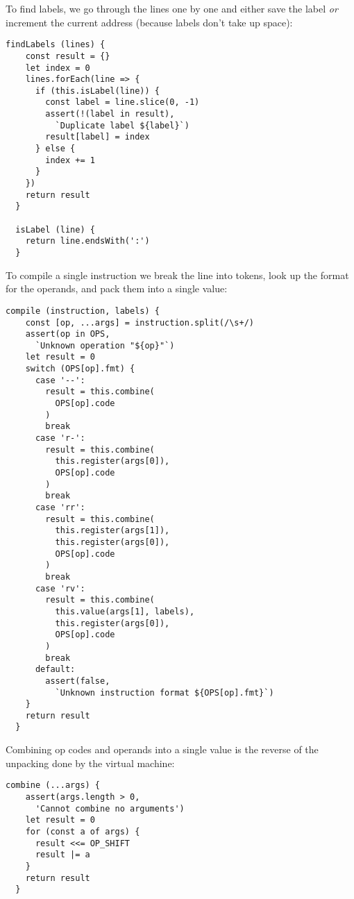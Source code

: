 \documentclass[krantzl]{krantz}
\begin{document}
To find labels,
we go through the lines one by one
and either save the label \emph{or} increment the current address
(because labels don't take up space):


\begin{lstlisting}[frame=single,frameround=tttt]
  findLabels (lines) {
    const result = {}
    let index = 0
    lines.forEach(line => {
      if (this.isLabel(line)) {
        const label = line.slice(0, -1)
        assert(!(label in result),
          `Duplicate label ${label}`)
        result[label] = index
      } else {
        index += 1
      }
    })
    return result
  }

  isLabel (line) {
    return line.endsWith(':')
  }
\end{lstlisting}



To compile a single instruction we break the line into tokens,
look up the format for the operands,
and pack them into a single value:


\begin{lstlisting}[frame=single,frameround=tttt]
  compile (instruction, labels) {
    const [op, ...args] = instruction.split(/\s+/)
    assert(op in OPS,
      `Unknown operation "${op}"`)
    let result = 0
    switch (OPS[op].fmt) {
      case '--':
        result = this.combine(
          OPS[op].code
        )
        break
      case 'r-':
        result = this.combine(
          this.register(args[0]),
          OPS[op].code
        )
        break
      case 'rr':
        result = this.combine(
          this.register(args[1]),
          this.register(args[0]),
          OPS[op].code
        )
        break
      case 'rv':
        result = this.combine(
          this.value(args[1], labels),
          this.register(args[0]),
          OPS[op].code
        )
        break
      default:
        assert(false,
          `Unknown instruction format ${OPS[op].fmt}`)
    }
    return result
  }
\end{lstlisting}



Combining op codes and operands into a single value
is the reverse of the unpacking done by the virtual machine:


\begin{lstlisting}[frame=single,frameround=tttt]
  combine (...args) {
    assert(args.length > 0,
      'Cannot combine no arguments')
    let result = 0
    for (const a of args) {
      result <<= OP_SHIFT
      result |= a
    }
    return result
  }
\end{lstlisting}
\end{document}
